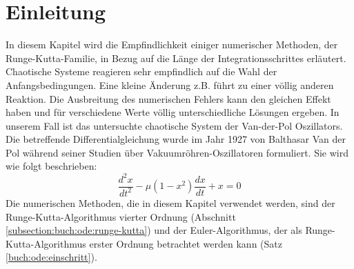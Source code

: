 %
%
%
\section{Einleitung\label{vanderpol:section:einleitung}}
In diesem Kapitel wird die Empfindlichkeit einiger numerischer Methoden, der Runge-Kutta-Familie, in Bezug auf die Länge der Integrationsschrittes erläutert.
Chaotische Systeme reagieren sehr empfindlich auf die Wahl der Anfangsbedingungen. Eine kleine Änderung z.B. führt zu einer völlig anderen Reaktion.
Die Ausbreitung des numerischen Fehlers kann den gleichen Effekt haben und für verschiedene Werte völlig unterschiedliche Lösungen ergeben.
In unserem Fall ist das untersuchte chaotische System der Van-der-Pol Oszillators.
Die betreffende Differentialgleichung wurde im Jahr 1927 von Balthasar Van der Pol während seiner Studien über Vakuumröhren-Oszillatoren formuliert.
Sie wird wie folgt beschrieben:
\begin{equation}
\frac{d^{2}x}{dt^{2}} - \mu (1 - x^{2}) \frac{dx}{dt} + x = 0
\label{vanderpol:equations:vdp}
\end{equation}
Die numerischen Methoden, die in diesem Kapitel verwendet werden, sind der Runge-Kutta-Algorithmus vierter Ordnung (Abschnitt \ref{subsection:buch:ode:runge-kutta}) und der Euler-Algorithmus, der als Runge-Kutta-Algorithmus erster Ordnung betrachtet werden kann (Satz \ref{buch:ode:einschritt}).
